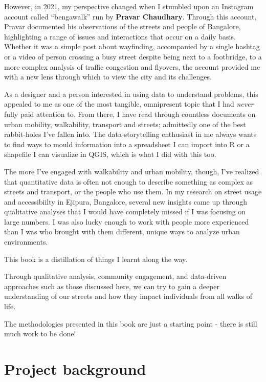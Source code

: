 \documentclass[
]{latex/krantz}
\begin{document}
However, in 2021, my perspective changed when I stumbled upon an Instagram account called ``bengawalk'' run by \textbf{Pravar Chaudhary}. Through this account, Pravar documented his observations of the streets and people of Bangalore, highlighting a range of issues and interactions that occur on a daily basis. Whether it was a simple post about wayfinding, accompanied by a single hashtag or a video of person crossing a busy street despite being next to a footbridge, to a more complex analysis of traffic congestion and flyovers, the account provided me with a new lens through which to view the city and its challenges.

As a designer and a person interested in using data to understand problems, this appealed to me as one of the most tangible, omnipresent topic that I had \emph{never} fully paid attention to. From there, I have read through countless documents on urban mobility, walkability, transport and streets; admittedly one of the best rabbit-holes I've fallen into. The data-storytelling enthusiast in me always wants to find ways to mould information into a spreadsheet I can import into R or a shapefile I can visualize in QGIS, which is what I did with this too.

The more I've engaged with walkability and urban mobility, though, I've realized that quantitative data is often not enough to describe something as complex as streets and transport, or the people who use them. In my research on street usage and accessibiilty in Ejipura, Bangalore, several new insights came up through qualitative analyses that I would have completely missed if I was focusing on large numbers. I was also lucky enough to work with people more experienced than I was who brought with them different, unique ways to analyze urban environments.

This book is a distillation of things I learnt along the way.

Through qualitative analysis, community engagement, and data-driven approaches such as those discussed here, we can try to gain a deeper understanding of our streets and how they impact individuals from all walks of life.

The methodologies presented in this book are just a starting point - there is still much work to be done!

\hypertarget{pb}{%
\section{Project background}\label{pb}}
\end{document}
